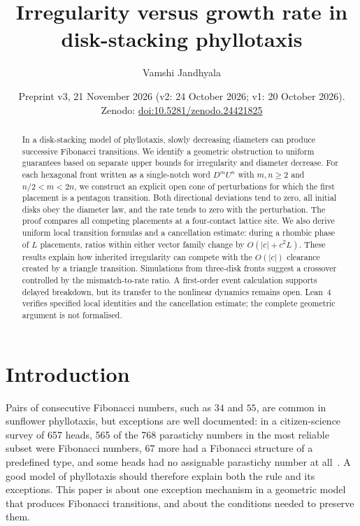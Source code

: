 \documentclass[11pt]{amsart}
\title[Irregularity versus growth rate in phyllotaxis]{Irregularity versus growth rate in\\ disk-stacking phyllotaxis}
\author{Vamshi Jandhyala}
\date{Preprint v3, 21 November 2026 (v2: 24 October 2026; v1: 20 October 2026). Zenodo: \href{https://doi.org/10.5281/zenodo.24421825}{doi:10.5281/zenodo.24421825}}
\theoremstyle{definition}
\begin{document}
\raggedbottom
\begin{abstract}
In a disk-stacking model of phyllotaxis, slowly decreasing diameters can produce successive
Fibonacci transitions. We identify a geometric obstruction to uniform guarantees based on separate
upper bounds for irregularity and diameter decrease. For each hexagonal front written as a single-notch
word $D^mU^n$ with $m,n\ge2$ and $n/2<m<2n$, we construct an explicit open cone of perturbations for which the first placement is a
pentagon transition. Both directional deviations tend to zero, all initial disks obey the diameter
law, and the rate tends to zero with the perturbation. The proof compares all competing placements
at a four-contact lattice site. We also derive uniform local transition formulas and a cancellation
estimate: during a rhombic phase of $L$ placements, ratios within either vector family change by
$O(|c|+c^2L)$. These results explain how inherited irregularity can compete with the $O(|c|)$ clearance
created by a triangle transition. Simulations from three-disk fronts suggest a crossover controlled
by the mismatch-to-rate ratio. A first-order event calculation supports delayed breakdown, but its
transfer to the nonlinear dynamics remains open. Lean~4 verifies specified local identities and
the cancellation estimate; the complete geometric argument is not formalised.
\end{abstract}
\maketitle

\section{Introduction}\label{sec:intro}

Pairs of consecutive Fibonacci numbers, such as $34$ and $55$, are common in sunflower
phyllotaxis, but exceptions are well documented: in a citizen-science survey of 657 heads, 565 of the 768 parastichy
numbers in the most reliable subset were Fibonacci numbers, 67 more had a Fibonacci structure of a
predefined type, and some heads had no assignable parastichy number at all~\cite{SwintonOchu}. A good model of phyllotaxis should
therefore explain both the rule and its exceptions. This paper is about one exception mechanism
in a geometric model that produces Fibonacci transitions, and about the conditions needed
to preserve them.
\end{document}
